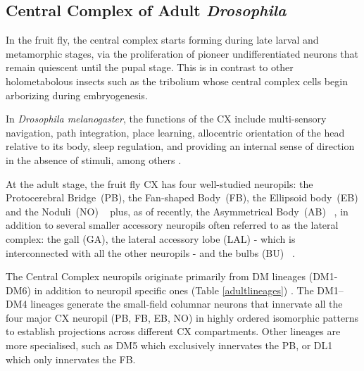     \subsection{Central Complex of Adult \textit{Drosophila}}
        In the fruit fly, the central complex starts forming during late larval and metamorphic stages, via the proliferation of pioneer undifferentiated neurons that remain quiescent until the pupal stage. This is in contrast to other holometabolous insects such as the tribolium \citep{farnworth2022atlas} whose central complex cells begin arborizing during embryogenesis.

        In  \textit{Drosophila melanogaster}, the functions of the CX include multi-sensory navigation, path integration, place learning, allocentric orientation of the head relative to its body, sleep regulation, and providing an internal sense of direction in the absence of stimuli, among others \citep{hanesch1989neuronal, ofstad2011visual, seelig2013feature, PfeifferHomberg2014, Stone2017CXModel, franconville2018building, heinze2018principles, szuperak2018sleep, pisokas2020head, ShaferKeene2021sleep, fisher2022flexible}.

        At the adult stage, the fruit fly CX has four well-studied neuropils: the Protocerebral Bridge~(PB), the Fan-shaped Body~(FB), the Ellipsoid body~(EB) and the Noduli~(NO) ~\citep{hanesch1989neuronal} plus, as of recently, the Asymmetrical Body~(AB) ~\citep{wolff2018neuroarchitecture,hulse2021connectome}, in addition to several smaller accessory neuropils often referred to as the lateral complex: the gall (GA), the lateral accessory lobe (LAL) - which is interconnected with all the other neuropils -  and the bulbs (BU)  ~\citep{wolff2015neuroarchitecture, franconville2018building, hulse2021connectome}. 
        

        The Central Complex neuropils originate primarily from DM lineages (DM1-DM6) in addition to neuropil specific ones (Table \ref{adultlineages})  \citep{yang2013diverse,andrade2019developmentally}. %
        The DM1–DM4 lineages generate the small-field columnar neurons that innervate all the four major CX neuropil (PB, FB, EB, NO) in highly ordered isomorphic patterns to establish projections across different CX compartments. 
        Other lineages are more specialised, such as DM5 which exclusively innervates the PB, or DL1 which only innervates the FB. 

